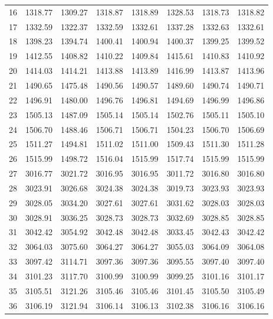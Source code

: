 \documentclass[10pt,oneside]{article}
\begin{document}
\begin{table}[h!]
\begin{tabular}{cccccccc}
16 &   1318.77 & 1309.27 & 1318.87 & 1318.89 &      1328.53 & 1318.73 & 1318.82 \\
17 &   1332.59 & 1322.37 & 1332.59 & 1332.61 &      1337.28 & 1332.63 & 1332.61 \\
18 &   1398.23 & 1394.74 & 1400.41 & 1400.94 &      1400.37 & 1399.25 & 1399.52 \\
19 &   1412.55 & 1408.82 & 1410.22 & 1409.84 &      1415.61 & 1410.83 & 1410.92 \\
20 &   1414.03 & 1414.21 & 1413.88 & 1413.89 &      1416.99 & 1413.87 & 1413.96 \\
21 &   1490.65 & 1475.48 & 1490.56 & 1490.57 &      1489.60 & 1490.74 & 1490.71 \\
22 &   1496.91 & 1480.00 & 1496.76 & 1496.81 &      1494.69 & 1496.99 & 1496.86 \\
23 &   1505.13 & 1487.09 & 1505.14 & 1505.14 &      1502.76 & 1505.11 & 1505.10 \\
24 &   1506.70 & 1488.46 & 1506.71 & 1506.71 &      1504.23 & 1506.70 & 1506.69 \\
25 &   1511.27 & 1494.81 & 1511.02 & 1511.00 &      1509.43 & 1511.30 & 1511.28 \\
26 &   1515.99 & 1498.72 & 1516.04 & 1515.99 &      1517.74 & 1515.99 & 1515.99 \\
27 &   3016.77 & 3021.72 & 3016.95 & 3016.95 &      3011.72 & 3016.80 & 3016.80 \\
28 &   3023.91 & 3026.68 & 3024.38 & 3024.38 &      3019.73 & 3023.93 & 3023.93 \\
29 &   3028.05 & 3034.20 & 3027.61 & 3027.61 &      3031.62 & 3028.03 & 3028.03 \\
30 &   3028.91 & 3036.25 & 3028.73 & 3028.73 &      3032.69 & 3028.85 & 3028.85 \\
31 &   3042.42 & 3054.92 & 3042.48 & 3042.48 &      3033.45 & 3042.43 & 3042.42 \\
32 &   3064.03 & 3075.60 & 3064.27 & 3064.27 &      3055.03 & 3064.09 & 3064.08 \\
33 &   3097.42 & 3114.71 & 3097.36 & 3097.36 &      3095.55 & 3097.40 & 3097.40 \\
34 &   3101.23 & 3117.70 & 3100.99 & 3100.99 &      3099.25 & 3101.16 & 3101.17 \\
35 &   3105.51 & 3121.26 & 3105.46 & 3105.46 &      3101.45 & 3105.50 & 3105.49 \\
36 &   3106.19 & 3121.94 & 3106.14 & 3106.13 &      3102.38 & 3106.16 & 3106.16 \\
\bottomrule
\end{tabular}
\end{table}
\end{document}
